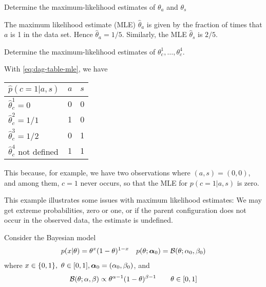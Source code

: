 \begin{exenumerate}
\item Determine the maximum-likelihood estimates of $\theta_a$ and $\theta_s$
  \begin{solution}
    The maximum likelihood estimate (MLE) $\hat{\theta}_a$ is given by
    the fraction of times that $a$ is 1 in the data set. Hence
    $\hat{\theta}_a = 1/5$. Similarly, the MLE $\hat{\theta}_s$ is
    $2/5$.
    
  \end{solution}

\item \label{q:cancer-smoking-asbestos-mle} Determine the maximum-likelihood estimates of $\theta_c^1, \ldots, \theta_c^4$.
 
  \begin{solution}
    With \eqref{eq:dag-table-mle}, we have
    \begin{center}
      \begin{tabular}{@{}lll@{}}
        \toprule
        $\hat{p}(c=1 | a,s)$ & $a$ & $s$\\
        \midrule
        $\hat{\theta}^1_c = 0$ & 0 & 0\\
        $\hat{\theta}^2_c = 1/1$ & 1 & 0\\
        $\hat{\theta}^3_c = 1/2$ & 0 & 1\\
        $\hat{\theta}^4_c$ not defined & 1 & 1\\
        \bottomrule
      \end{tabular}
    \end{center}
    This because, for example, we have two observations where
    $(a,s)=(0,0)$, and among them, $c=1$ never occurs, so that the MLE for
    $p(c=1 | a,s)$ is zero.

    This example illustrates some issues with maximum likelihood
    estimates: We may get extreme probabilities, zero or one, or if the
    parent configuration does not occur in the observed data, the estimate
    is undefined.

  \end{solution}
  
\end{exenumerate}


\label{ex:Bayesian-inference-Bernoulli}
Consider the Bayesian model
\begin{align*}
  p(x | \theta) &= \theta^x (1-\theta)^{1-x} & p(\theta ; \boldsymbol{\alpha}_0) = \mathcal{B}(\theta ; \alpha_0, \beta_0)
\end{align*}
where $x \in \{0,1\}, \ \theta \in [0,1], \alphab_0 = (\alpha_0,\beta_0)$, and
\begin{equation}
  \mathcal{B}(\theta; \alpha, \beta) \propto \theta^{\alpha-1}(1-\theta)^{\beta-1} \quad \quad \theta \in [0,1]
\end{equation}

